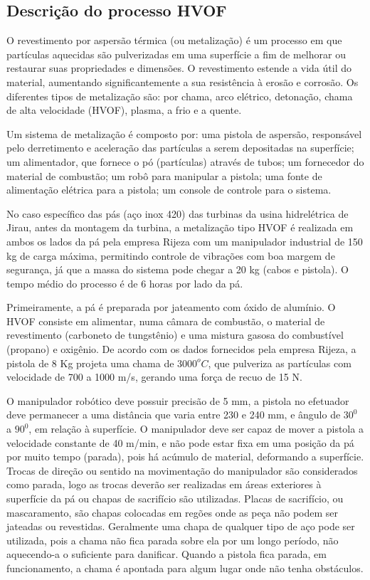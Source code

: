\subsection{Descrição do processo HVOF}\label{sec::desc_hvof}
O revestimento por aspersão térmica (ou metalização) é um processo em que
partículas aquecidas são pulverizadas em uma superfície a fim de melhorar ou
restaurar suas propriedades e dimensões. O revestimento estende a vida útil do
material, aumentando significantemente a sua resistência à erosão e corrosão.
Os diferentes tipos de metalização são: por chama, arco elétrico, detonação,
chama de alta velocidade (HVOF), plasma, a frio e a quente.

Um sistema de metalização é composto por: uma pistola de aspersão, responsável
pelo derretimento e aceleração das partículas a serem depositadas na
superfície; um alimentador, que fornece o pó (partículas) através de tubos;
um fornecedor do material de combustão; um robô para manipular a pistola; uma
fonte de alimentação elétrica para a pistola; um console de controle para o
sistema.

No caso específico das pás (aço inox 420) das turbinas da usina hidrelétrica de
Jirau, antes da montagem da turbina, a metalização tipo HVOF é realizada em
ambos os lados da pá pela empresa Rijeza com um manipulador industrial de 150 kg
de carga máxima, permitindo controle de vibrações com boa margem de segurança, já que a massa do
sistema pode chegar a 20 kg (cabos e pistola). O tempo
médio do processo é de 6 horas por lado da pá.

Primeiramente, a pá é preparada por jateamento com óxido de alumínio. O HVOF
consiste em alimentar, numa câmara de combustão, o material de revestimento
(carboneto de tungstênio) e uma mistura gasosa do combustível (propano) e
oxigênio. De acordo com os dados fornecidos pela empresa Rijeza, a pistola de 8
Kg projeta uma chama de $3000^oC$, que pulveriza as partículas com velocidade de
700 a 1000 m/s, gerando uma força de recuo de 15 N.

O manipulador robótico deve possuir precisão de 5 mm, a pistola no efetuador
deve permanecer a uma distância que varia entre 230 e 240 mm, e ângulo de $30^0$
a $90^0$, em relação à superfície. O manipulador deve ser capaz de mover a
pistola a velocidade constante de 40 m/min, e não pode estar fixa em uma posição
da pá por muito tempo (parada), pois há acúmulo de material, deformando a
superfície. Trocas de direção ou sentido na movimentação do manipulador são
considerados como parada, logo as trocas deverão ser realizadas em áreas
exteriores à superfície da pá ou chapas de sacrifício são utilizadas. Placas de
sacrifício, ou mascaramento, são chapas colocadas em regões onde as peça não
podem ser jateadas ou revestidas. Geralmente uma chapa de qualquer tipo de aço
pode ser utilizada, pois a chama não fica parada sobre ela por um longo período,
não aquecendo-a o suficiente para danificar. Quando a pistola fica parada, em
funcionamento, a chama é apontada para algum lugar onde não tenha obstáculos.

